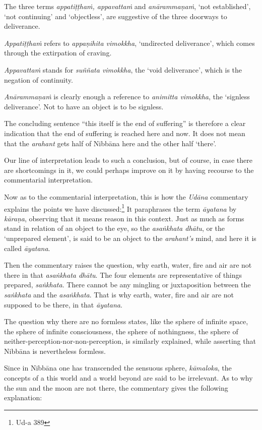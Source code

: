 The three terms \emph{appatiṭṭhaṁ, appavattaṁ} and \emph{anārammaṇaṁ}, `not established', `not continuing' and `objectless', are suggestive of the three doorways to deliverance.

\emph{Appatiṭṭhaṁ} refers to \emph{appaṇihita vimokkha}, `undirected deliverance', which comes through the extirpation of craving.

\emph{Appavattaṁ} stands for \emph{suññata vimokkha}, the `void deliverance', which is the negation of continuity.

\emph{Anārammaṇaṁ} is clearly enough a reference to \emph{animitta vimokkha}, the `signless deliverance'. Not to have an object is to be signless.

The concluding sentence ``this itself is the end of suffering'' is therefore a clear indication that the end of suffering is reached here and now. It does not mean that the \emph{arahant} gets half of Nibbāna here and the other half `there'.

Our line of interpretation leads to such a conclusion, but of course, in case there are shortcomings in it, we could perhaps improve on it by having recourse to the commentarial interpretation.

Now as to the commentarial interpretation, this is how the \emph{Udāna} commentary explains the points we have discussed:\footnote{Ud-a 389} It paraphrases the term \emph{āyatana} by \emph{kāraṇa}, observing that it means reason in this context. Just as much as forms stand in relation of an object to the eye, so the \emph{asaṅkhata dhātu}, or the `unprepared element', is said to be an object to the \emph{arahant's} mind, and here it is called \emph{āyatana}.

Then the commentary raises the question, why earth, water, fire and air are not there in that \emph{asaṅkhata dhātu}. The four elements are representative of things prepared, \emph{saṅkhata}. There cannot be any mingling or juxtaposition between the \emph{saṅkhata} and the \emph{asaṅkhata}. That is why earth, water, fire and air are not supposed to be there, in that \emph{āyatana}.

The question why there are no formless states, like the sphere of infinite space, the sphere of infinite consciousness, the sphere of nothingness, the sphere of neither-perception-nor-non-perception, is similarly explained, while asserting that Nibbāna is nevertheless formless.

Since in Nibbāna one has transcended the sensuous sphere, \emph{kāmaloka}, the concepts of a this world and a world beyond are said to be irrelevant. As to why the sun and the moon are not there, the commentary gives the following explanation:

